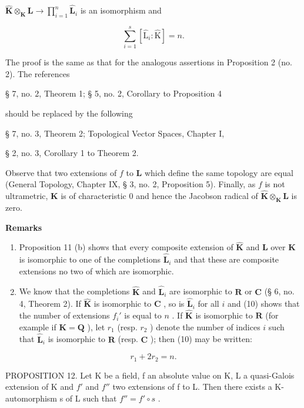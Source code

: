\(\hat{\mathbf{K}}\otimes_{\mathbf{K}}\mathbf{L}\rightarrow \prod_{i = 1}^{n}\hat{\mathbf{L}}_i\) is an isomorphism and

\[
\sum_ {i = 1} ^ {s} \left[ \hat {\mathrm{L}} _ {i}: \hat {\mathrm{K}} \right] = n.\tag{10}
\]

The proof is the same as that for the analogous assertions in Proposition 2 (no. 2). The references

§ 7, no. 2, Theorem 1; § 5, no. 2, Corollary to Proposition 4

should be replaced by the following

§ 7, no. 3, Theorem 2; Topological Vector Spaces, Chapter I,

§ 2, no. 3, Corollary 1 to Theorem 2.

Observe that two extensions of \(f\) to \(\mathbf{L}\) which define the same topology are equal (General Topology, Chapter IX, § 3, no. 2, Proposition 5). Finally, as \(f\) is not ultrametric, \(\mathbf{K}\) is of characteristic 0 and hence the Jacobson radical of \(\hat{\mathbf{K}} \otimes_{\mathbf{K}} \mathbf{L}\) is zero.

\textbf{Remarks}\par

\begin{enumerate}
\def\labelenumi{(\arabic{enumi})}
\item
  Proposition 11 (b) shows that every composite extension of \(\hat{\mathbf{K}}\) and \(\mathbf{L}\) over \(\mathbf{K}\) is isomorphic to one of the completions \(\hat{\mathbf{L}}_i\) and that these are composite extensions no two of which are isomorphic.
\item
  We know that the completions \(\hat{\mathbf{K}}\) and \(\hat{\mathbf{L}}_i\) are isomorphic to \(\mathbf{R}\) or \(\mathbf{C}\) (§ 6, no. 4, Theorem 2). If \(\hat{\mathbf{K}}\) is isomorphic to \(\mathbf{C}\) , so is \(\hat{\mathbf{L}}_i\) for all \(i\) and (10) shows that the number of extensions \(f_i'\) is equal to \(n\) . If \(\hat{\mathbf{K}}\) is isomorphic to \(\mathbf{R}\) (for example if \(\mathbf{K} = \mathbf{Q}\) ), let \(r_1\) (resp. \(r_2\) ) denote the number of indices \(i\) such that \(\hat{\mathbf{L}}_i\) is isomorphic to \(\mathbf{R}\) (resp. \(\mathbf{C}\) ); then (10) may be written:
\end{enumerate}

\[
r _ {1} + 2 r _ {2} = n.\tag{11}
\]

PROPOSITION 12. Let K be a field, f an absolute value on K, L a quasi-Galois extension of K and \(f'\) and \(f''\) two extensions of f to L. Then there exists a K-automorphism s of L such that \(f'' = f' \circ s\) .

